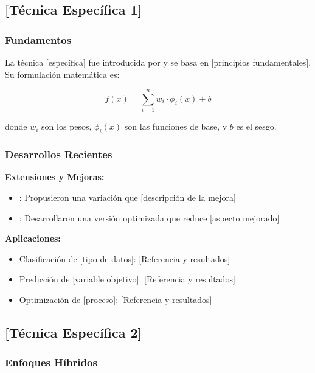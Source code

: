\subsection{[Técnica Específica 1]}

\subsubsection{Fundamentos}

La técnica [específica] fue introducida por \citet{autor_original} y se basa en [principios fundamentales]. Su formulación matemática es:

\begin{equation}
f(x) = \sum_{i=1}^{n} w_i \cdot \phi_i(x) + b
\label{eq:tecnica_especifica}
\end{equation}

donde $w_i$ son los pesos, $\phi_i(x)$ son las funciones de base, y $b$ es el sesgo.

\subsubsection{Desarrollos Recientes}

\textbf{Extensiones y Mejoras:}
\begin{itemize}
    \item \citet{autor2021_extension}: Propusieron una variación que [descripción de la mejora]
    \item \citet{autor2022_mejora}: Desarrollaron una versión optimizada que reduce [aspecto mejorado]
\end{itemize}

\textbf{Aplicaciones:}
\begin{itemize}
    \item Clasificación de [tipo de datos]: [Referencia y resultados]
    \item Predicción de [variable objetivo]: [Referencia y resultados]
    \item Optimización de [proceso]: [Referencia y resultados]
\end{itemize}

\subsection{[Técnica Específica 2]}

\subsubsection{Enfoques Híbridos}


